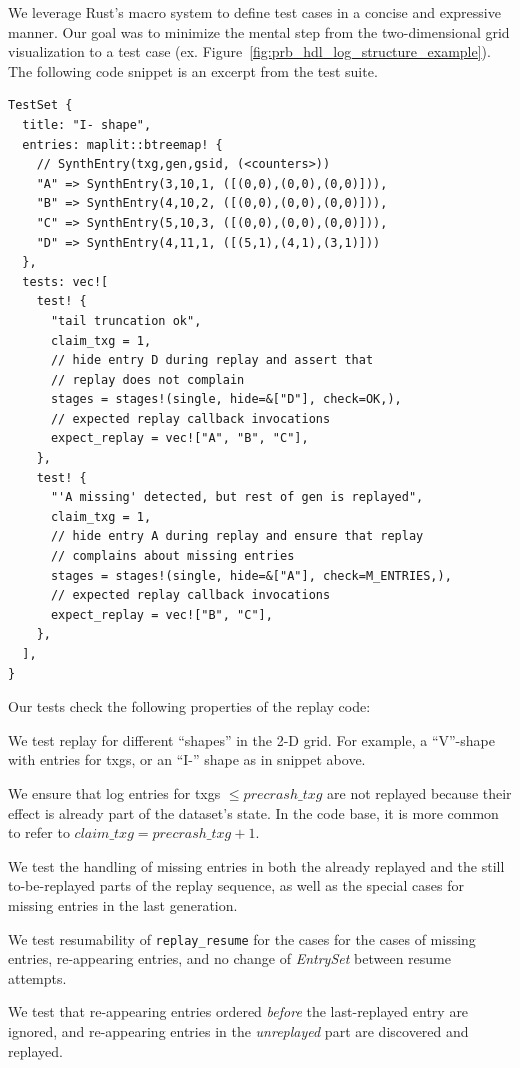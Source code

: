 \documentclass[12pt,a4paper,twoside]{book}
\begin{document}
We leverage Rust's macro system to define test cases in a concise and expressive manner.
Our goal was to minimize the mental step from the two-dimensional grid visualization to a test case (ex. Figure~\ref{fig:prb_hdl_log_structure_example}).
The following code snippet is an excerpt from the test suite.

\begin{lstlisting}[style=figurepseudocode]
TestSet {
  title: "I- shape",
  entries: maplit::btreemap! {
    // SynthEntry(txg,gen,gsid, (<counters>))
    "A" => SynthEntry(3,10,1, ([(0,0),(0,0),(0,0)])),
    "B" => SynthEntry(4,10,2, ([(0,0),(0,0),(0,0)])),
    "C" => SynthEntry(5,10,3, ([(0,0),(0,0),(0,0)])),
    "D" => SynthEntry(4,11,1, ([(5,1),(4,1),(3,1)]))
  },
  tests: vec![
    test! {
      "tail truncation ok",
      claim_txg = 1,
      // hide entry D during replay and assert that
      // replay does not complain
      stages = stages!(single, hide=&["D"], check=OK,),
      // expected replay callback invocations
      expect_replay = vec!["A", "B", "C"],
    },
    test! {
      "'A missing' detected, but rest of gen is replayed",
      claim_txg = 1,
      // hide entry A during replay and ensure that replay
      // complains about missing entries
      stages = stages!(single, hide=&["A"], check=M_ENTRIES,),
      // expected replay callback invocations
      expect_replay = vec!["B", "C"],
    },
  ],
}
\end{lstlisting}

Our tests check the following properties of the replay code:
\begin{description}[noitemsep,leftmargin=1.5cm,labelindent=1cm]
    \item[Shapes] We test replay for different ``shapes'' in the 2-D grid.
        For example, a ``V''-shape with entries for txgs, or an ``I-'' shape as in snippet above.
    \item[Claim Txg] We ensure that log entries for txgs $\le precrash\_txg$ are not replayed because their effect is already part of the dataset's state.
        In the code base, it is more common to refer to $claim\_txg = precrash\_txg + 1$.
    \item[Missing Entry Handling] We test the handling of missing entries in both the already replayed and the still to-be-replayed parts of the replay sequence, as well as the special cases for missing entries in the last generation.
    \item[Resumability] We test resumability of \lstinline{replay_resume} for the cases for the cases of missing entries, re-appearing entries, and no change of \textit{EntrySet} between resume attempts.
    \item[Entry Reappearance] We test that re-appearing entries ordered \textit{before} the last-replayed entry are ignored, and re-appearing entries in the \textit{unreplayed} part are discovered and replayed.
\end{description}
\end{document}
